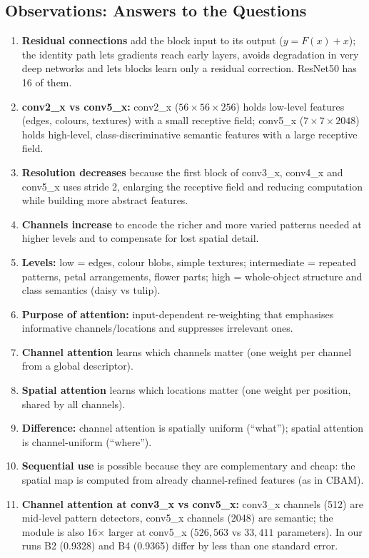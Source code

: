 \documentclass[10pt]{article}
\begin{document}
\subsection*{Observations: Answers to the Questions}
\begin{enumerate}
\item \textbf{Residual connections} add the block input to its output ($y=F(x)+x$); the identity path lets gradients reach early layers, avoids degradation in very deep networks and lets blocks learn only a residual correction. ResNet50 has 16 of them.
\item \textbf{conv2\_x vs conv5\_x:} conv2\_x ($56\times56\times256$) holds low-level features (edges, colours, textures) with a small receptive field; conv5\_x ($7\times7\times2048$) holds high-level, class-discriminative semantic features with a large receptive field.
\item \textbf{Resolution decreases} because the first block of conv3\_x, conv4\_x and conv5\_x uses stride 2, enlarging the receptive field and reducing computation while building more abstract features.
\item \textbf{Channels increase} to encode the richer and more varied patterns needed at higher levels and to compensate for lost spatial detail.
\item \textbf{Levels:} low = edges, colour blobs, simple textures; intermediate = repeated patterns, petal arrangements, flower parts; high = whole-object structure and class semantics (daisy vs tulip).
\item \textbf{Purpose of attention:} input-dependent re-weighting that emphasises informative channels/locations and suppresses irrelevant ones.
\item \textbf{Channel attention} learns which channels matter (one weight per channel from a global descriptor).
\item \textbf{Spatial attention} learns which locations matter (one weight per position, shared by all channels).
\item \textbf{Difference:} channel attention is spatially uniform (``what''); spatial attention is channel-uniform (``where'').
\item \textbf{Sequential use} is possible because they are complementary and cheap: the spatial map is computed from already channel-refined features (as in CBAM).
\item \textbf{Channel attention at conv3\_x vs conv5\_x:} conv3\_x channels (512) are mid-level pattern detectors, conv5\_x channels (2048) are semantic; the module is also 16$\times$ larger at conv5\_x ($526{,}563$ vs $33{,}411$ parameters). In our runs B2 (0.9328) and B4 (0.9365) differ by less than one standard error.

\end{enumerate}
\end{document}
